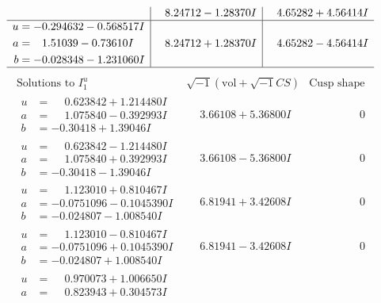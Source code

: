 \documentclass[1p]{elsarticle_modified}
\theoremstyle{definition}
\newcommand{\I}{\sqrt{-1}}
\begin{document}
$$\begin{array}{c|c|c}
 & \phantom{-}8.24712 - 1.28370 I & \phantom{-}4.65282 + 4.56414 I \\ \hline\begin{aligned}
u &= -0.294632 - 0.568517 I \\
a &= \phantom{-}1.51039 - 0.73610 I \\
b &= -0.028348 - 1.231060 I\end{aligned}
 & \phantom{-}8.24712 + 1.28370 I & \phantom{-}4.65282 - 4.56414 I\\
 \hline 
 \end{array}$$\newpage$$\begin{array}{c|c|c}  
\text{Solutions to }I^u_{1}& \I (\text{vol} + \sqrt{-1}CS) & \text{Cusp shape}\\
 \hline 
\begin{aligned}
u &= \phantom{-}0.623842 + 1.214480 I \\
a &= \phantom{-}1.075840 - 0.392993 I \\
b &= -0.30418 + 1.39046 I\end{aligned}
 & \phantom{-}3.66108 + 5.36800 I & \phantom{-0.000000 } 0 \\ \hline\begin{aligned}
u &= \phantom{-}0.623842 - 1.214480 I \\
a &= \phantom{-}1.075840 + 0.392993 I \\
b &= -0.30418 - 1.39046 I\end{aligned}
 & \phantom{-}3.66108 - 5.36800 I & \phantom{-0.000000 } 0 \\ \hline\begin{aligned}
u &= \phantom{-}1.123010 + 0.810467 I \\
a &= -0.0751096 - 0.1045390 I \\
b &= -0.024807 - 1.008540 I\end{aligned}
 & \phantom{-}6.81941 + 3.42608 I & \phantom{-0.000000 } 0 \\ \hline\begin{aligned}
u &= \phantom{-}1.123010 - 0.810467 I \\
a &= -0.0751096 + 0.1045390 I \\
b &= -0.024807 + 1.008540 I\end{aligned}
 & \phantom{-}6.81941 - 3.42608 I & \phantom{-0.000000 } 0 \\ \hline\begin{aligned}
u &= \phantom{-}0.970073 + 1.006650 I \\
a &= \phantom{-}0.823943 + 0.304573 I \\

\end{aligned}
\end{array}$$
\end{document}
